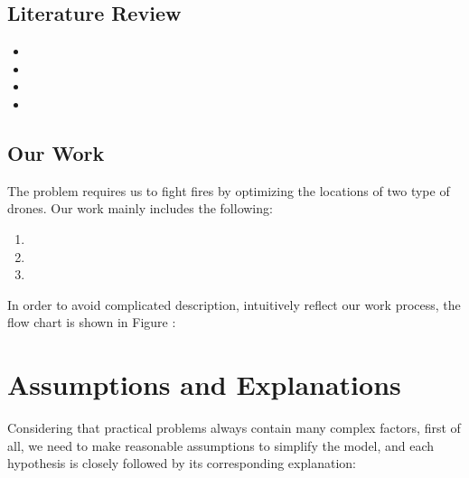 \documentclass[12pt]{article}  %
\begin{document}
\subsection{Literature Review} %

\begin{itemize}
\setlength{\parsep}{0ex} %
\setlength{\topsep}{2ex} %
\setlength{\itemsep}{1ex} %
\item 

\item
 
\item 

\item 

\end{itemize}


\subsection{Our Work} %
The problem requires us to fight fires by optimizing the locations of two type of drones. Our work mainly includes the following:
\begin{enumerate}[\bfseries 1.]
    \setlength{\parsep}{0ex} %
    \setlength{\topsep}{0.5pt} %
    \setlength{\itemsep}{0.5pt} %
    \item 
    \item 
    \item 
\end{enumerate}
In order to avoid complicated description, intuitively reflect our work process, the flow chart is shown in Figure :


\section{Assumptions and Explanations} %
Considering that practical problems always contain many complex factors, first of all, we need to make reasonable assumptions to simplify the model, and each hypothesis is closely followed by its corresponding explanation:
\end{document}

